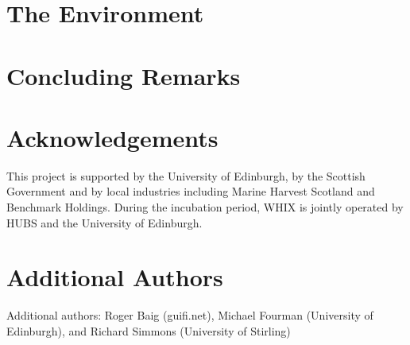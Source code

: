 \documentclass{sig-alternate-05-2015}
\begin{document}

\section{The Environment}\label{subsec:hubs}

\section{Concluding Remarks} \label{sec:conc} 

\section{Acknowledgements}
This project is supported by the University of Edinburgh, by the
Scottish Government and by local industries including Marine Harvest
Scotland and Benchmark Holdings.  During the incubation period,
\ac{WHIX} is jointly operated by HUBS and the University of Edinburgh.

\section{Additional Authors}
Additional authors: Roger Baig (guifi.net), Michael Fourman (University of
Edinburgh), and Richard Simmons (University of Stirling)



\end{document}
